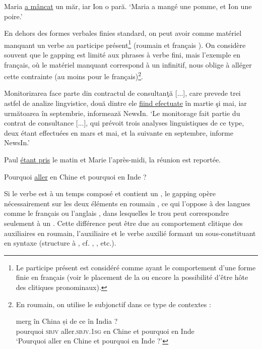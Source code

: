 \ex Maria \uline{a mâncat} un măr, iar Ion o pară.
\glt ‘Maria a mangé une pomme, et Ion une poire.’
\z
\z

En dehors des formes verbales finies standard, on peut avoir comme matériel manquant un verbe au participe présent\footnote{
 Le participe présent est considéré comme ayant le comportement d’une forme finie en français (voir le placement de la  ou encore la possibilité d’être hôte des clitiques pronominaux).} (roumain  et français ). On considère souvent que le gapping est limité aux phrases à verbe fini, mais l’exemple  en français, où le matériel manquant correspond à un infinitif, nous oblige à alléger cette contrainte (au moins pour le français)\footnote{
 En roumain, on utilise le subjonctif dans ce type de contextes :
 
 \ea
     merg  în  China  și  {de ce}  în  {India ?}\\
 pourquoi  \textsc{sbjv} aller.\textsc{sbjv.1sg}  en  Chine  et  pourquoi  en  Inde\\
 \glt ‘Pourquoi aller en Chine et pourquoi en Inde ?’
 \z
 
}.                             

\ea \label{ch2:ex73}
Monitorizarea face parte din contractul de consultanţă [...], care prevede trei astfel de analize lingvistice, două dintre ele \uline{fiind efectuate} în martie şi mai, iar următoarea în septembrie, informează NewsIn. %
\glt  ‘Le monitorage fait partie du contrat de consultance [...], qui prévoit trois analyses linguistiques de ce type, deux étant effectuées en mars et mai, et la suivante en septembre, informe NewsIn.’    
\z

\ea \label{ch2:ex74}
Paul \uline{étant pris} le matin et Marie l’après-midi, la réunion est reportée.
\z

\ea \label{ch2:ex75}
Pourquoi \uline{aller} en Chine et pourquoi en Inde ?
\z

Si le verbe est à un temps composé et contient un , le gapping opère nécessairement sur les deux éléments en roumain , ce qui l’oppose à des langues comme le français  ou l’anglais , dans lesquelles le trou peut correspondre seulement à un . Cette différence peut être due au comportement clitique des auxiliaires en roumain, l’auxiliaire et le verbe auxilié formant un sous-constituant en syntaxe (structure à , cf. \citealt{Barbu1999}, \citealt{Bilbiie2011}, etc.).

